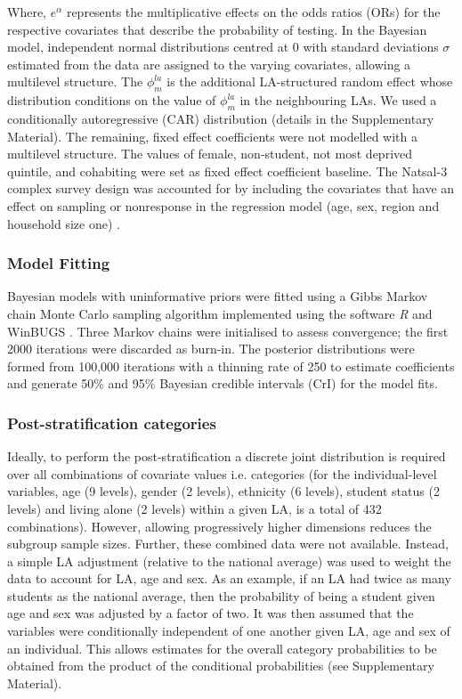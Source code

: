 \documentclass[fleqn,10pt]{wlscirep}
\begin{document}
Where, $e^{\alpha}$ represents the multiplicative effects on the odds ratios (ORs) for the respective covariates that describe the probability of testing. In the Bayesian model, independent normal distributions centred at 0 with standard deviations $\sigma$ estimated from the data are assigned to the varying covariates, allowing a multilevel structure. The $\phi_m^{la}$ is the additional LA-structured random effect whose distribution conditions on the value of $\phi_m^{la}$ in the neighbouring LAs. We used a conditionally autoregressive (CAR) distribution (details in the Supplementary Material). The remaining, fixed effect coefficients were not modelled with a multilevel structure. The values of female, non-student, not most deprived quintile, and cohabiting were set as fixed effect coefficient baseline.
The Natsal-3 complex survey design was accounted for by including the covariates that have an effect on sampling or nonresponse in the regression model (age, sex, region and household size one) \cite{Gelman2007b}.

\subsubsection*{Model Fitting}
Bayesian models with uninformative priors were fitted using a Gibbs Markov chain Monte Carlo sampling algorithm implemented using the software {\it R} \cite{RCoreTeam2017} and WinBUGS \cite{Lunn2000}. Three Markov chains were initialised to assess convergence; the first 2000 iterations were discarded as burn-in. The posterior distributions were formed from 100,000 iterations with a thinning rate of 250 to estimate coefficients and generate 50\% and 95\% Bayesian credible intervals (CrI) for the model fits.

\subsubsection*{Post-stratification categories}
Ideally, to perform the post-stratification a discrete joint distribution is required over all combinations of covariate values i.e. categories (for the individual-level variables, age (9 levels), gender (2 levels), ethnicity (6 levels), student status (2 levels) and living alone (2 levels) within a given LA, is a total of 432 combinations). However, allowing progressively higher dimensions reduces the subgroup sample sizes. Further, these combined data were not available. Instead, a simple LA adjustment (relative to the national average) was used to weight the data to account for LA, age and sex. As an example, if an LA had twice as many students as the national average, then the probability of being a student given age and sex was adjusted by a factor of two.
It was then assumed that the variables were conditionally independent of one another given LA, age and sex of an individual. This allows estimates for the overall category probabilities to be obtained from the product of the conditional probabilities (see Supplementary Material). 
\end{document}
